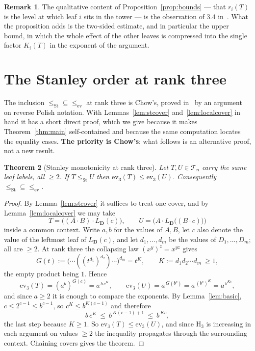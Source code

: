 \documentclass[11pt,a4paper]{article}
\theoremstyle{plain}
\newtheorem{theorem}{Theorem}[section]
\theoremstyle{definition}
\newtheorem{remark}[theorem]{Remark}
\newcommand{\HH}{\mathrm{H}}
\newcommand{\ev}{\mathrm{ev}}
\newcommand{\Tam}{\mathcal{T}}
\newcommand{\St}{\mathrm{St}}
\begin{document}
\begin{remark}\label{rem:csw}
The qualitative content of Proposition~\ref{prop:bounds} --- that $r_i(T)$ is the level
at which leaf $i$ sits in the tower --- is the observation of $3.4$ in~\cite{CsW}. What
the proposition adds is the two-sided estimate, and in particular the upper bound, in
which the whole effect of the other leaves is compressed into the single factor
$K_i(T)$ in the exponent of the argument.
\end{remark}
\section{The Stanley order at rank three}\label{sec:chow}

The inclusion $\le_{\St}\subseteq\le_{\ev}$ at rank three is Chow's, proved
in~\cite{MO} by an argument on reverse Polish notation. With
Lemmas~\ref{lem:stcover} and~\ref{lem:localcover} in hand it has a short direct proof,
which we give because it makes Theorem~\ref{thm:main} self-contained and because the
same computation locates the equality cases. \textbf{The priority is Chow's}; what
follows is an alternative proof, not a new result.

\begin{theorem}[Stanley monotonicity at rank three]\label{thm:chow}
Let $T,U\in\Tam_n$ carry the same leaf labels, all $\ge2$. If $T\le_{\St}U$ then
$\ev_3(T)\le\ev_3(U)$. Consequently $\le_{\St}\subseteq\le_{\ev}$.
\end{theorem}

\begin{proof}
By Lemma~\ref{lem:stcover} it suffices to treat one cover, and by
Lemma~\ref{lem:localcover} we may take
\[
  T=\bigl((A\cdot B)\cdot L_{\mathbf D}(c)\bigr),
  \qquad
  U=\bigl(A\cdot L_{\mathbf D}\bigl((B\cdot c)\bigr)\bigr)
\]
inside a common context. Write $a,b$ for the values of $A,B$, let $c$ also denote the
value of the leftmost leaf of $L_{\mathbf D}(c)$, and let $d_1,\dots,d_m$ be the values
of $D_1,\dots,D_m$; all are $\ge2$. At rank three the collapsing law
$(x^{y})^{z}=x^{yz}$ gives
\[
  G(t):=\bigl(\cdots((t^{d_1})^{d_2})\cdots\bigr)^{d_m}=t^{K},
  \qquad K:=d_1d_2\cdots d_m\ \ge1,
\]
the empty product being $1$. Hence
\[
  \ev_3(T)=(a^{b})^{G(c)}=a^{\,b\,c^{K}},
  \qquad
  \ev_3(U)=a^{\,G(b^{c})}=a^{\,(b^{c})^{K}}=a^{\,b^{Kc}} ,
\]
and since $a\ge2$ it is enough to compare the exponents. By Lemma~\ref{lem:basic},
$c\le2^{c-1}\le b^{c-1}$, so $c^{K}\le b^{K(c-1)}$ and therefore
\begin{equation}\label{eq:chow}
  b\,c^{K}\ \le\ b^{\,K(c-1)+1}\ \le\ b^{\,Kc},
\end{equation}
the last step because $K\ge1$. So $\ev_3(T)\le\ev_3(U)$, and since $\HH_3$ is
increasing in each argument on values $\ge2$ the inequality propagates through the
surrounding context. Chaining covers gives the theorem.
\end{proof}
\end{document}
